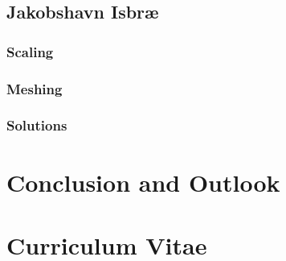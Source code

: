 \documentclass[a4paper,twoside,11pt,pdftex]{report}
\begin{document}
\section{Jakobshavn Isbr{\ae}}\label{sec:jakobshavn}

\subsection{Scaling}\label{sec:vhtscaling}


\subsection{Meshing}\label{sec:jakomeshing}

\subsection{Solutions}\label{sec:jakosolutions}


\cleardoublepage

\chapter{Conclusion and Outlook}\label{chap:outlook}

\cleardoublepage



\cleardoublepage

\appendix

\pagestyle{plain}
\chapter*{Curriculum Vitae}

\end{document}
